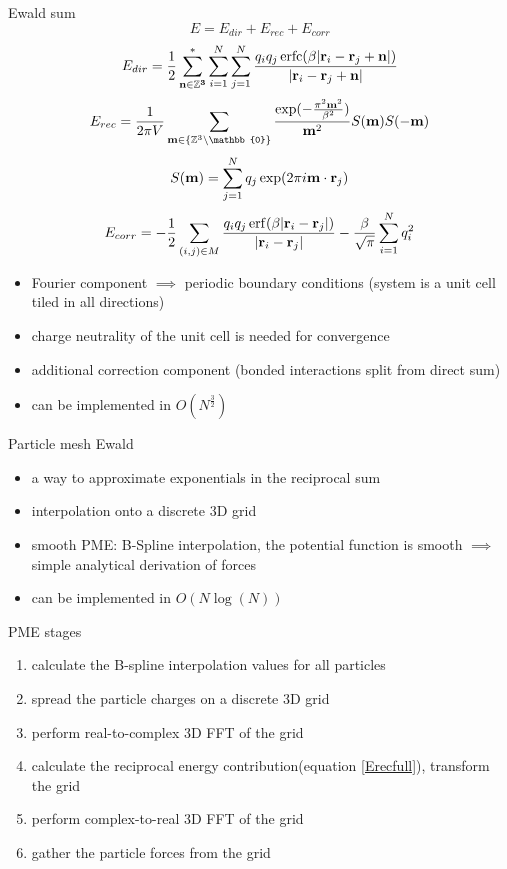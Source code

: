 \documentclass[11pt]{beamer}
\DeclareMathOperator\erf{erf}
\DeclareMathOperator\erfc{erfc}
\begin{document}
\begin{frame}{Ewald sum}
\[E = E_{dir} + E_{rec} + E_{corr}\]
\[
E_{dir} = \frac{1}{2}\sum\limits_{\bold{n\in \mathbb{Z}^3}}^*\sum\limits_{i=1}^N\sum\limits_{j=1}^N\frac{q_i q_j \erfc(\beta\lvert\bold{r}_i - \bold{r}_j + \bold{n} \rvert)}{\lvert\bold{r}_i - \bold{r}_j + \bold{n} \rvert}
\]
\[
E_{rec}=\frac{1}{2\pi V}\sum\limits_{\bold{m} \in \{\mathbb{Z}^3 \setminus \mathbb{0}\}}\frac{\exp(-\frac{\pi^2\bold{m}^2}{\beta^2})}{\bold{m}^2}S(\bold{m})S(\bold{-m})
\]
\[
 S(\bold{m}) = 
\sum\limits_{j=1}^Nq_j \exp(2\pi i\bold{m}\cdot\bold{r}_j)
\]
\[E_{corr} = -\frac{1}{2}\sum\limits_{(i,j)\in M}\frac{q_i q_j \erf(\beta\lvert\bold{r}_i - \bold{r}_j\rvert)}{\lvert\bold{r}_i - \bold{r}_j\rvert} - \frac{\beta}{\sqrt{\pi}}\sum\limits_{i=1}^N q_i^2\]

\begin{itemize}
\item Fourier component $\implies$ periodic boundary conditions (system is a unit cell tiled in all directions)
\item charge neutrality of the unit cell is needed for convergence
\item additional correction component (bonded interactions split from direct sum)
\item can be implemented in $O(N^\frac{3}{2})$

\end{itemize}
\end{frame}

\begin{frame}{Particle mesh Ewald}
\begin{itemize}
\item a way to approximate exponentials in the reciprocal sum 
\item interpolation onto a discrete 3D grid
\item smooth PME: B-Spline interpolation, the potential function is smooth $\implies$ simple analytical derivation of forces
\item can be implemented in $O(N \log(N))$
\end{itemize}
\end{frame}

\begin{frame}{PME stages}
\begin{enumerate}
\item calculate the B-spline interpolation values for all particles
\item spread the particle charges on a discrete 3D grid
\item perform real-to-complex 3D FFT of the grid
\item calculate the reciprocal energy contribution(equation \eqref{Erecfull}), transform the grid
\item perform complex-to-real 3D FFT of the grid
\item gather the particle forces from the grid
\end{enumerate}
\end{frame}
\end{document}
